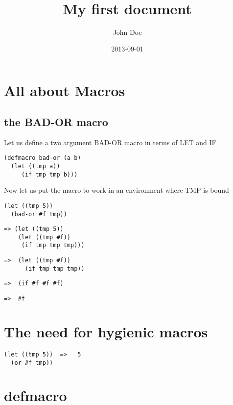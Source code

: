 \documentclass{article}
\title{My first document}
\date{2013-09-01}
\author{John Doe}
\begin{document}
\maketitle
\newpage
{}

\section{All about Macros}


\subsection{the BAD-OR macro}

Let us define a two argument BAD-OR macro in terms of LET and IF

\begin{verbatim}
(defmacro bad-or (a b) 
  (let ((tmp a))
     (if tmp tmp b)))
\end{verbatim}

Now let us put the macro to work in an environment where TMP is bound

\begin{verbatim}
(let ((tmp 5)) 
  (bad-or #f tmp))
\end{verbatim}

\begin{verbatim}
=> (let ((tmp 5)) 
    (let ((tmp #f))
     (if tmp tmp tmp)))
\end{verbatim}

\begin{verbatim}
=>  (let ((tmp #f))
      (if tmp tmp tmp))
\end{verbatim}

\begin{verbatim}
=>  (if #f #f #f)
\end{verbatim}

\begin{verbatim}
=>  #f
\end{verbatim}

\section{The need for hygienic macros}

\begin{verbatim}
(let ((tmp 5))  =>   5
  (or #f tmp))
\end{verbatim}

\newpage

\section{defmacro}
\end{document}
